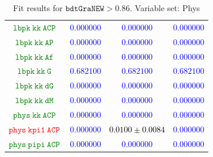 \documentclass[10pt,a4paper]{article}
\begin{document}
\begin{table}[h!]
{\begin{tabular}{cccc}
\textcolor{Green}{$\mathtt{lbpk~kk~ACP~}$} & \textcolor{blue}{$0.000000$}& \textcolor{blue}{$0.000000$}& \textcolor{blue}{$0.000000$}\\
\textcolor{Green}{$\mathtt{lbpk~kk~AP~}$} & \textcolor{blue}{$0.000000$}& \textcolor{blue}{$0.000000$}& \textcolor{blue}{$0.000000$}\\
\textcolor{Green}{$\mathtt{lbpk~kk~Af~}$} & \textcolor{blue}{$0.000000$}& \textcolor{blue}{$0.000000$}& \textcolor{blue}{$0.000000$}\\
\textcolor{Green}{$\mathtt{lbpk~kk~G~}$} & \textcolor{blue}{$0.682100$}& \textcolor{blue}{$0.682100$}& \textcolor{blue}{$0.682100$}\\
\textcolor{Green}{$\mathtt{lbpk~kk~dG~}$} & \textcolor{blue}{$0.000000$}& \textcolor{blue}{$0.000000$}& \textcolor{blue}{$0.000000$}\\
\textcolor{Green}{$\mathtt{lbpk~kk~dM~}$} & \textcolor{blue}{$0.000000$}& \textcolor{blue}{$0.000000$}& \textcolor{blue}{$0.000000$}\\
\textcolor{Green}{$\mathtt{phys~kk~ACP~}$} & \textcolor{blue}{$0.000000$}& \textcolor{blue}{$0.000000$}& \textcolor{blue}{$0.000000$}\\
\textcolor{red}{$\mathtt{phys~kpi1~ACP~}$} & \textcolor{blue}{$0.000000$}& \textcolor{black}{$0.0100 \pm 0.0084$}& \textcolor{blue}{$0.000000$}\\
\textcolor{Green}{$\mathtt{phys~pipi~ACP~}$} & \textcolor{blue}{$0.000000$}& \textcolor{blue}{$0.000000$}& \textcolor{blue}{$0.000000$}\\
\hline
\end{tabular}
}
\caption{Fit results for $\mathtt{bdtGraNEW}> 0.86$.
        Variable set: Phys}
\label{tab:GraNEW_0.86_Phys}
\end{table}
\begin{table}[h!]
\centering
{}
\caption{Fit results for $\mathtt{bdtGraNEW}> 0.86$.
        Variable set: ResT}
\label{tab:GraNEW_0.86_ResT}
\end{table}
\end{document}
